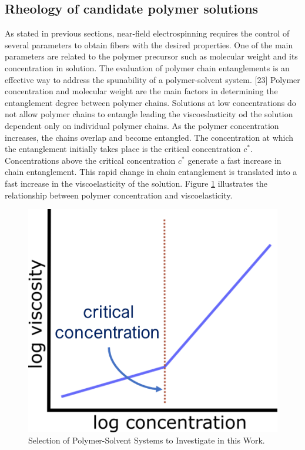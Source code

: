 \subsection{Rheology of candidate polymer solutions}
As stated in previous sections, near-field electrospinning requires the control of several parameters to obtain fibers with the desired properties. One of the main parameters are related to the polymer precursor such as molecular weight and its concentration in solution. The evaluation of polymer chain entanglements is an effective way to address the spunability of a polymer-solvent system. [23] Polymer concentration and molecular weight are the main factors in determining the entanglement degree between polymer chains. Solutions at low concentrations do not allow polymer chains to entangle leading the viscoeslasticity od the solution dependent only on individual polymer chains. As the polymer concentration increases, the chains overlap and become entangled. The concentration at which the entanglement initially takes place is the critical concentration $c^*$. Concentrations above the critical concentration $c^*$ generate a fast increase in chain entanglement. This rapid change in chain entanglement is translated into a fast increase in the viscoelasticity of the solution. Figure \ref{fig:concentrationViscosityPlotExplained} illustrates the relationship between polymer concentration and viscoelasticity.
\cite{Han2019} 

\begin{figure}[!th]
\centering
\includegraphics[scale=0.45]{./Figures/concentrationViscosityPlotExplained.png}
\decoRule
\caption[Selection of Polymer-Solvent Systems to Investigate in this Work]{Selection of Polymer-Solvent Systems to Investigate in this Work. \cite{Burghelea2020, Gupta2005}}
\label{fig:concentrationViscosityPlotExplained}
\end{figure}


